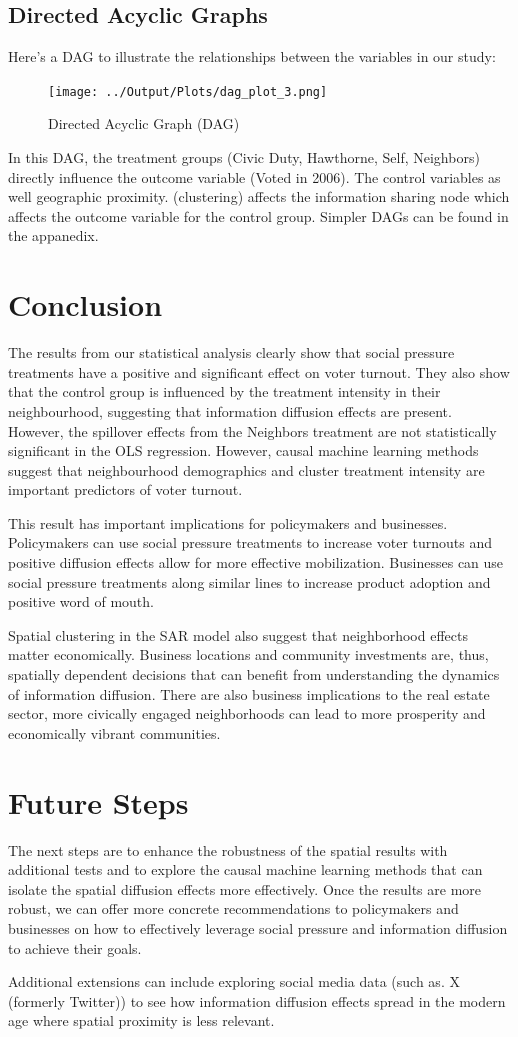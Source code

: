 \documentclass[11pt, draft]{article}
\begin{document}
\subsection{Directed Acyclic Graphs}
Here's a DAG to illustrate the relationships between the variables in our study:
\begin{figure}[H]
    \centering
    \texttt{[image: ../Output/Plots/dag\_plot\_3.png]}
    \caption{Directed Acyclic Graph (DAG)}
    \label{fig:dag}
\end{figure}
In this DAG, the treatment groups (Civic Duty, Hawthorne, Self, Neighbors) directly influence the outcome variable (Voted in 2006). The control variables as well geographic proximity. (clustering) affects the information sharing node which affects the outcome variable for the control group. Simpler DAGs can be found in the appanedix.

\section{Conclusion}
The results from our statistical analysis clearly show that social pressure treatments have a positive and significant effect on voter turnout. They also show that the control group is influenced by the treatment intensity in their neighbourhood, suggesting that information diffusion effects are present. However, the spillover effects from the Neighbors treatment are not statistically significant in the OLS regression. However, causal machine learning methods suggest that neighbourhood demographics and cluster treatment intensity are important predictors of voter turnout.

This result has important implications for policymakers and businesses. Policymakers can use social pressure treatments to increase voter turnouts and positive diffusion effects allow for more effective mobilization. Businesses can use social pressure treatments along similar lines to increase product adoption and positive word of mouth. 

Spatial clustering in the SAR model also suggest that neighborhood effects matter economically. Business locations and community investments are, thus, spatially dependent decisions that can benefit from understanding the dynamics of information diffusion. There are also business implications to the real estate sector, more civically engaged neighborhoods can lead to more prosperity and economically vibrant communities.

\section{Future Steps}
The next steps are to enhance the robustness of the spatial results with additional tests and to explore the causal machine learning methods that can isolate the spatial diffusion effects more effectively. Once the results are more robust, we can offer more concrete recommendations to policymakers and businesses on how to effectively leverage social pressure and information diffusion to achieve their goals.

Additional extensions can include exploring social media data (such as. X (formerly Twitter)) to see how information diffusion effects spread in the modern age where spatial proximity is less relevant.


\end{document}
